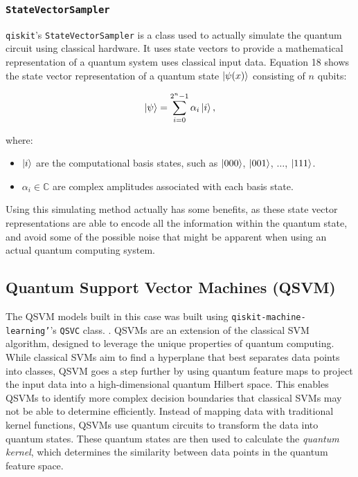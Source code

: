 \documentclass[11pt, oneside]{article}   	%
\begin{document}


\subsubsection{\texttt{StateVectorSampler}}

\texttt{qiskit}'s \texttt{StateVectorSampler} is a class used to actually simulate the quantum circuit using classical hardware. It uses state vectors to provide a mathematical representation of a quantum system uses classical input data. Equation 18 shows the state vector representation of a quantum state $\ket{\psi(x)}$ consisting of $n$ qubits:

\begin{equation}
\ket{\psi} = \sum_{i=0}^{2^n - 1} \alpha_i \ket{i},
\end{equation}

where:

\begin{itemize}
    \item $\ket{i}$ are the computational basis states, such as $\ket{000}$, $\ket{001}$, $\dots$, $\ket{111}$.
    \item $\alpha_i \in \mathbb{C}$ are complex amplitudes associated with each basis state.
\end{itemize}

Using this simulating method actually has some benefits, as these state vector representations are able to encode all the information within the quantum state, and avoid some of the possible noise that might be apparent when using an actual quantum computing system. 




\subsection{Quantum Support Vector Machines (QSVM)}

The QSVM models built in this case was built using \texttt{qiskit-machine-learning'}'s \texttt{QSVC} class. \hspace{10mm}. QSVMs are an extension of the classical SVM algorithm, designed to leverage the unique properties of quantum computing. While classical SVMs aim to find a hyperplane that best separates data points into classes, QSVM goes a step further by using quantum feature maps to project the input data into a high-dimensional quantum Hilbert space. This enables QSVMs to identify more complex decision boundaries that classical SVMs may not be able to determine efficiently. Instead of mapping data with traditional kernel functions, QSVMs use quantum circuits to transform the data into quantum states. These quantum states are then used to calculate the \textit{quantum kernel}, which determines the similarity between data points in the quantum feature space. \\
\end{document}
